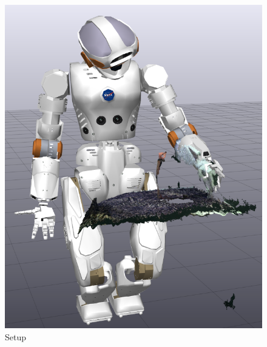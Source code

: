 \begin{figure}
\centering
\begin{minipage}{0.45\textwidth}
\centering
\includegraphics[width=1.0\textwidth]{images/eval_prior/sequence/prior_setting.png} 
\caption{Setup}
\label{fig:prior_setting}
\end{minipage}
%
\hspace{0.3cm}
\begin{minipage}{0.45\textwidth}
\vspace{0.8cm}
\centering
{}

\end{minipage}
\end{figure}
